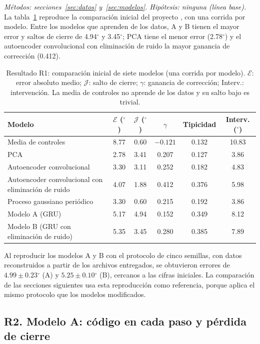 \documentclass[11pt,a4paper]{article}
\newcommand{\gr}{$^{\circ}$}
\begin{document}
\textit{Métodos: secciones~\ref{sec:datos} y~\ref{sec:modelos}. Hipótesis: ninguna (línea base).} La tabla~\ref{tab:inicial} reproduce la comparación inicial del proyecto \cite{neurostride2026}, con una corrida por modelo. Entre los modelos que aprenden de los datos, A y B tienen el mayor error y saltos de cierre de 4.94\gr{} y 3.45\gr{}; PCA tiene el menor error (2.78\gr) y el autoencoder convolucional con eliminación de ruido la mayor ganancia de corrección (0.412).

\begin{table}[h]
\centering\small
\setlength{\tabcolsep}{4pt}
\begin{tabular}{lccccc}
\toprule
Modelo & $\mathcal E$ (\gr) & $\mathcal J$ (\gr) & $\gamma$ & Tipicidad & Interv. (\gr) \\
\midrule
Media de controles & 8.77 & 0.60 & $-0.121$ & 0.132 & 10.83 \\
PCA & 2.78 & 3.41 & 0.207 & 0.127 & 3.86 \\
Autoencoder convolucional & 3.30 & 3.11 & 0.252 & 0.182 & 4.83 \\
Autoencoder convolucional con eliminación de ruido & 4.07 & 1.88 & 0.412 & 0.376 & 5.98 \\
Proceso gaussiano periódico & 3.30 & 0.60 & 0.215 & 0.192 & 3.86 \\
Modelo A (GRU) & 5.17 & 4.94 & 0.152 & 0.349 & 8.12 \\
Modelo B (GRU con eliminación de ruido) & 5.35 & 3.45 & 0.280 & 0.385 & 7.89 \\
\bottomrule
\end{tabular}
\caption{Resultado R1: comparación inicial de siete modelos (una corrida por modelo). $\mathcal E$: error absoluto medio; $\mathcal J$: salto de cierre; $\gamma$: ganancia de corrección; Interv.: intervención. La media de controles no aprende de los datos y su salto bajo es trivial.}
\label{tab:inicial}
\end{table}

Al reproducir los modelos A y B con el protocolo de cinco semillas, con datos reconstruidos a partir de los archivos entregados, se obtuvieron errores de $4.99\pm0.23$\gr{} (A) y $5.25\pm0.10$\gr{} (B), cercanos a las cifras iniciales. La comparación de las secciones siguientes usa esta reproducción como referencia, porque aplica el mismo protocolo que los modelos modificados.

\subsection{R2. Modelo A: código en cada paso y pérdida de cierre}
\label{sec:r2}
\end{document}
